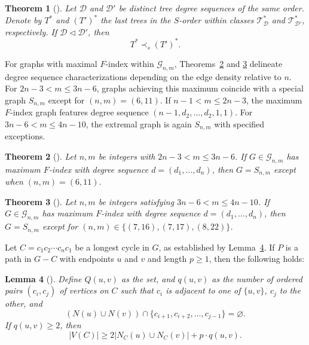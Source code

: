 \documentclass{article}
\newtheorem{theorem}{Theorem}[section]
\newtheorem{lemma}[theorem]{Lemma}
\theoremstyle{definition}
\begin{document}
\begin{theorem}[\cite{ShuchaoLSYibing}]\label{thm1Preliminaries}
Let $\mathscr{D}$ and $\mathscr{D}'$ be distinct tree degree sequences of the same order. Denote by $T^*$ and $(T')^*$ the last trees in the $S$-order within classes $\mathscr{T}^*_{\mathscr{D}}$ and $\mathscr{T}^*_{\mathscr{D}'}$, respectively. If $\mathscr{D} \lhd \mathscr{D}'$, then
$$T^* \prec_s (T')^*.$$
\end{theorem}

For graphs with maximal $F$-index within $\mathcal{G}_{n,m}$, Theorems~\ref{thm1conjn1} and \ref{thm2conjn1} delineate degree sequence characterizations depending on the edge density relative to $n$. For $2n - 3 < m \leq 3n - 6$, graphs achieving this maximum coincide with a special graph $S_{n,m}$ except for $(n,m) = (6,11)$. If $n - 1 < m \leq 2n - 3$, the maximum $F$-index graph features degree sequence $(n-1, d_2, \ldots, d_2, 1, 1)$. For $3n - 6 < m \leq 4n - 10$, the extremal graph is again $S_{n,m}$ with specified exceptions.

\begin{theorem}[\cite{Zhang2026WangXDH}]\label{thm1conjn1}
Let $n, m$ be integers with $2n-3 < m \leq 3n-6$. If $G \in \mathcal{G}_{n,m}$ has maximum $F$-index with degree sequence $d = (d_1, \ldots, d_n)$, then $G = S_{n,m}$ except when $(n,m) = (6,11)$.
\end{theorem}

\begin{theorem}[\cite{Zhang2026WangXDH}]\label{thm2conjn1}
Let $n, m$ be integers satisfying $3n-6 < m \leq 4n-10$. If $G \in \mathcal{G}_{n,m}$ has maximum $F$-index with degree sequence $d = (d_1, \ldots, d_n)$, then $G = S_{n,m}$ except for $(n,m) \in \{(7,16), (7,17), (8,22)\}$.
\end{theorem}
Let $C = c_1 c_2 \cdots c_n c_1$ be a longest cycle in $G$, as established by Lemma~\ref{lem1Bipartite}. If $P$ is a path in $G - C$ with endpoints $u$ and $v$ and length $p \geq 1$, then the following holds:

\begin{lemma}[\cite{B-Jackson}]\label{lem1Bipartite}
Define $Q(u,v)$ as the set, and $q(u,v)$ as the number of ordered pairs $(c_i, c_j)$ of vertices on $C$ such that $c_i$ is adjacent to one of $\{u,v\}$, $c_j$ to the other, and
\[
(N(u) \cup N(v)) \cap \{ c_{i+1}, c_{i+2}, \ldots, c_{j-1} \} = \varnothing.
\]
If $q(u,v) \geq 2$, then
\[
|V(C)| \geq 2 |N_C(u) \cup N_C(v)| + p \cdot q(u,v).
\]
\end{lemma}
\end{document}
